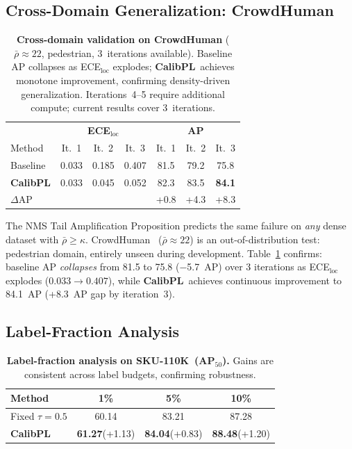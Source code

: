 \documentclass[10pt,twocolumn,letterpaper]{article}
\newcommand{\method}{\textbf{CalibPL}\xspace}
\newcommand{\sku}{\textsc{SKU-110K}\xspace}
\begin{document}
\subsection{Cross-Domain Generalization: CrowdHuman}

\begin{table}[t]
  \centering
  \caption{\textbf{Cross-domain validation on CrowdHuman}
  ($\bar{\rho}{\approx}22$, pedestrian, 3~iterations available).
  Baseline AP collapses as ECE$_\text{loc}$ explodes; \method\ achieves
  monotone improvement, confirming density-driven generalization.
  Iterations~4--5 require additional compute; current results cover 3~iterations.}
  \vspace{2pt}
  \begin{tabular}{l|ccc|ccc}
    \toprule
    & \multicolumn{3}{c|}{\textbf{ECE$_\text{loc}$}} & \multicolumn{3}{c}{\textbf{AP}} \\
    Method & It.~1 & It.~2 & It.~3 & It.~1 & It.~2 & It.~3 \\
    \midrule
    Baseline      & 0.033 & 0.185 & 0.407 & 81.5 & 79.2 & 75.8 \\
    \textbf{CalibPL} & 0.033 & 0.045 & 0.052 & 82.3 & 83.5 & \textbf{84.1} \\
    \midrule
    $\Delta$AP    & & & & +0.8 & +4.3 & +8.3 \\
    \bottomrule
  \end{tabular}
  \label{tab:crowdhuman}
  \vspace{-4pt}
\end{table}

The NMS Tail Amplification Proposition predicts the same failure on \emph{any}
dense dataset with $\bar{\rho}{\ge}\kappa$. CrowdHuman~\cite{crowdhuman2018}
($\bar{\rho}{\approx}22$) is an out-of-distribution test: pedestrian domain,
entirely unseen during development. Table~\ref{tab:crowdhuman} confirms:
baseline AP \emph{collapses} from 81.5 to 75.8 ($-$5.7~AP) over 3 iterations
as ECE$_\text{loc}$ explodes ($0.033\to0.407$), while \method\ achieves
continuous improvement to 84.1~AP (+8.3~AP gap by iteration~3).

\subsection{Label-Fraction Analysis}

\begin{table}[t]
  \centering
  \caption{\textbf{Label-fraction analysis on \sku\ (AP$_{50}$).} Gains are
  consistent across label budgets, confirming robustness.}
  \vspace{2pt}
  \begin{tabular}{lccc}
    \toprule
    Method & 1\% & 5\% & 10\% \\
    \midrule
    Fixed $\tau{=}0.5$  & 60.14 & 83.21 & 87.28 \\
    \textbf{CalibPL}    & \textbf{61.27}\tiny{(+1.13)} & \textbf{84.04}\tiny{(+0.83)} & \textbf{88.48}\tiny{(+1.20)} \\
    \bottomrule
  \end{tabular}
  \label{tab:label_fraction}
  \vspace{-4pt}
\end{table}
\end{document}
